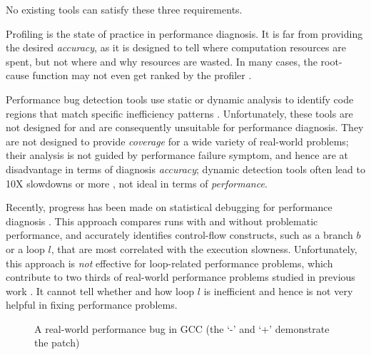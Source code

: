 No existing tools can satisfy these
three requirements.

Profiling is the state of practice in performance diagnosis.
It is far from providing the desired \textit{accuracy}, as it is designed to
tell where computation resources are spent, 
but not where and why resources are wasted. 
In many cases, the root-cause function may not even
get ranked by the profiler \cite{SongOOPSLA2014}.

Performance bug detection tools use static or dynamic analysis to identify
code regions that match specific inefficiency patterns 
\cite{Alabama,CARAMEL, Cachetor,Xu:2010:FLD:1806596.1806617,Dufour:2008:STC:1453101.1453111, Xu:2009:GFP:1542476.1542523, Xu:2010:DIC:1806596.1806616,IsilDillig.PLDI15}. 
Unfortunately, these tools are not designed for and are consequently
unsuitable for performance diagnosis.
They are not designed to provide \textit{coverage} for a wide
variety of real-world problems; their analysis is not guided by
performance failure symptom, and hence are at disadvantage in terms of diagnosis
\textit{accuracy}; dynamic detection tools often lead to 
10X slowdowns or more \cite{Cachetor,Xu:2010:FLD:1806596.1806617,Alabama}, 
not ideal in terms of \textit{performance}.

Recently, progress has been made on statistical debugging for
performance diagnosis \cite{SongOOPSLA2014}.
This approach compares runs with and without problematic performance, and
accurately identifies control-flow constructs, such as a branch $b$ or 
a loop $l$, that are most correlated with
the execution slowness.%
Unfortunately, this approach is \textit{not} effective
for loop-related 
performance problems, which contribute to two thirds of
real-world performance problems studied in previous work 
\cite{SongOOPSLA2014,PerfBug}. It cannot
tell whether and how loop $l$ is inefficient 
and hence is not very helpful
in fixing performance problems.

\begin{figure}
\centering
{}
  \mbox{}
\caption{A real-world performance bug in GCC (the `-' and `+' demonstrate the patch)}
\label{fig:GCC27733}
\end{figure}

